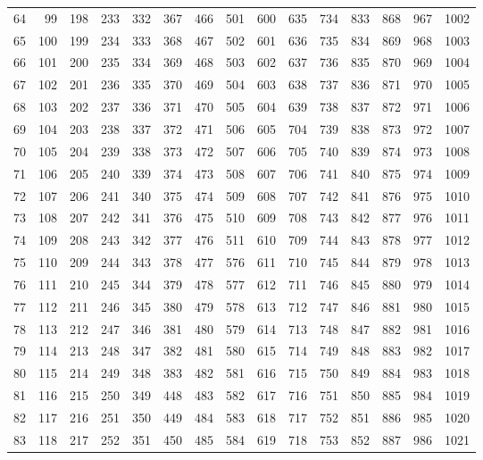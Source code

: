 \documentclass{assignment}
\begin{document}
\begin{tabular}{r r r r r r r r r r r r r r r}
64 & 99 & 198 & 233 & 332 & 367 & 466 & 501 & 600 & 635 & 734 & 833 & 868 & 967 & 1002 \\
65 & 100 & 199 & 234 & 333 & 368 & 467 & 502 & 601 & 636 & 735 & 834 & 869 & 968 & 1003 \\
66 & 101 & 200 & 235 & 334 & 369 & 468 & 503 & 602 & 637 & 736 & 835 & 870 & 969 & 1004 \\
67 & 102 & 201 & 236 & 335 & 370 & 469 & 504 & 603 & 638 & 737 & 836 & 871 & 970 & 1005 \\
68 & 103 & 202 & 237 & 336 & 371 & 470 & 505 & 604 & 639 & 738 & 837 & 872 & 971 & 1006 \\
69 & 104 & 203 & 238 & 337 & 372 & 471 & 506 & 605 & 704 & 739 & 838 & 873 & 972 & 1007 \\
70 & 105 & 204 & 239 & 338 & 373 & 472 & 507 & 606 & 705 & 740 & 839 & 874 & 973 & 1008 \\
71 & 106 & 205 & 240 & 339 & 374 & 473 & 508 & 607 & 706 & 741 & 840 & 875 & 974 & 1009 \\
72 & 107 & 206 & 241 & 340 & 375 & 474 & 509 & 608 & 707 & 742 & 841 & 876 & 975 & 1010 \\
73 & 108 & 207 & 242 & 341 & 376 & 475 & 510 & 609 & 708 & 743 & 842 & 877 & 976 & 1011 \\
74 & 109 & 208 & 243 & 342 & 377 & 476 & 511 & 610 & 709 & 744 & 843 & 878 & 977 & 1012 \\
75 & 110 & 209 & 244 & 343 & 378 & 477 & 576 & 611 & 710 & 745 & 844 & 879 & 978 & 1013 \\
76 & 111 & 210 & 245 & 344 & 379 & 478 & 577 & 612 & 711 & 746 & 845 & 880 & 979 & 1014 \\
77 & 112 & 211 & 246 & 345 & 380 & 479 & 578 & 613 & 712 & 747 & 846 & 881 & 980 & 1015 \\
78 & 113 & 212 & 247 & 346 & 381 & 480 & 579 & 614 & 713 & 748 & 847 & 882 & 981 & 1016 \\
79 & 114 & 213 & 248 & 347 & 382 & 481 & 580 & 615 & 714 & 749 & 848 & 883 & 982 & 1017 \\
80 & 115 & 214 & 249 & 348 & 383 & 482 & 581 & 616 & 715 & 750 & 849 & 884 & 983 & 1018 \\
81 & 116 & 215 & 250 & 349 & 448 & 483 & 582 & 617 & 716 & 751 & 850 & 885 & 984 & 1019 \\
82 & 117 & 216 & 251 & 350 & 449 & 484 & 583 & 618 & 717 & 752 & 851 & 886 & 985 & 1020 \\
83 & 118 & 217 & 252 & 351 & 450 & 485 & 584 & 619 & 718 & 753 & 852 & 887 & 986 & 1021 \\

\end{tabular}
\end{document}
